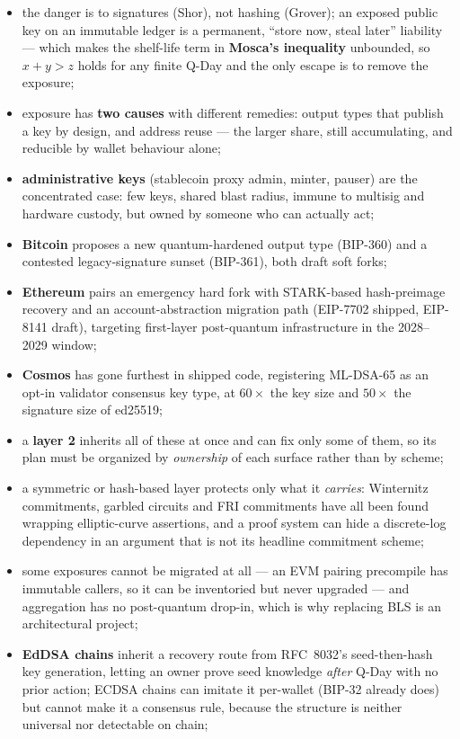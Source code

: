 \begin{itemize}
  \item the danger is to signatures (Shor), not hashing (Grover); an exposed public key on an immutable ledger is a permanent, ``store now, steal later'' liability --- which makes the shelf-life term in \textbf{Mosca's inequality} unbounded, so $x+y>z$ holds for any finite Q-Day and the only escape is to remove the exposure;
  \item exposure has \textbf{two causes} with different remedies: output types that publish a key by design, and address reuse --- the larger share, still accumulating, and reducible by wallet behaviour alone;
  \item \textbf{administrative keys} (stablecoin proxy admin, minter, pauser) are the concentrated case: few keys, shared blast radius, immune to multisig and hardware custody, but owned by someone who can actually act;
  \item \textbf{Bitcoin} proposes a new quantum-hardened output type (BIP-360) and a contested legacy-signature sunset (BIP-361), both draft soft forks;
  \item \textbf{Ethereum} pairs an emergency hard fork with STARK-based hash-preimage recovery and an account-abstraction migration path (EIP-7702 shipped, EIP-8141 draft), targeting first-layer post-quantum infrastructure in the 2028--2029 window;
  \item \textbf{Cosmos} has gone furthest in shipped code, registering ML-DSA-65 as an opt-in validator consensus key type, at $60\times$ the key size and $50\times$ the signature size of ed25519;
  \item a \textbf{layer 2} inherits all of these at once and can fix only some of them, so its plan must be organized by \emph{ownership} of each surface rather than by scheme;
  \item a symmetric or hash-based layer protects only what it \emph{carries}: Winternitz commitments, garbled circuits and FRI commitments have all been found wrapping elliptic-curve assertions, and a proof system can hide a discrete-log dependency in an argument that is not its headline commitment scheme;
  \item some exposures cannot be migrated at all --- an EVM pairing precompile has immutable callers, so it can be inventoried but never upgraded --- and aggregation has no post-quantum drop-in, which is why replacing BLS is an architectural project;
  \item \textbf{EdDSA chains} inherit a recovery route from RFC~8032's seed-then-hash key generation, letting an owner prove seed knowledge \emph{after} Q-Day with no prior action; ECDSA chains can imitate it per-wallet (BIP-32 already does) but cannot make it a consensus rule, because the structure is neither universal nor detectable on chain;

\end{itemize}
